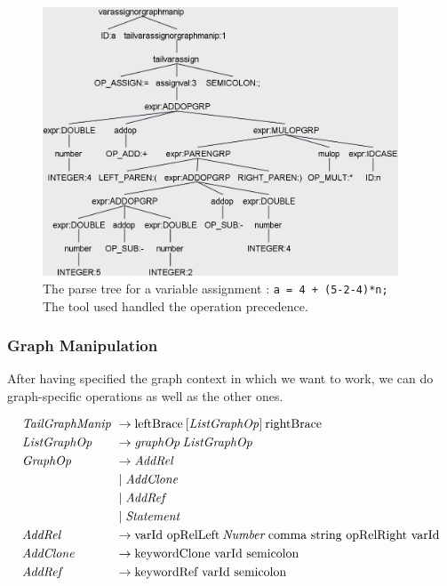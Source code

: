 \begin{figure}[H]
    \centering
    \includegraphics[height = 8cm]{figures/parse_trees/parseTree_varAssign}
    \caption{The parse tree for a variable assignment :  \texttt{a = 4 + (5-2-4)*n;} \\The tool used handled the operation precedence.}
    \label{fig:parseTree_varAssign}
\end{figure}

\subsubsection*{Graph Manipulation}

After having specified the graph context in which we want to work, we can do graph-specific operations as well as the other ones.

\begin{align*}
    \omit $\mathit{TailGraphManip}$ \hfil &\rightarrow \text{leftBrace} \: [\mathit{ListGraphOp}]  \: \text{rightBrace} \\
    \omit $\mathit{ListGraphOp}$ \hfil &\rightarrow \mathit{graphOp} \: \mathit{ListGraphOp} \\
    \omit $\mathit{GraphOp}$ \hfil &\rightarrow \mathit{AddRel}  \\
    & \mid \mathit{AddClone} \\
    & \mid \mathit{AddRef} \\
    & \mid \mathit{Statement} \\
    \omit $\mathit{AddRel}$ \hfil & \rightarrow \text{varId opRelLeft} \: \mathit{Number} \: \text{comma string opRelRight varId} \\
    \omit $\mathit{AddClone}$ \hfil & \rightarrow \text{keywordClone varId semicolon} \\
    \omit $\mathit{AddRef}$ \hfil & \rightarrow \text{keywordRef varId semicolon}
\end{align*}

